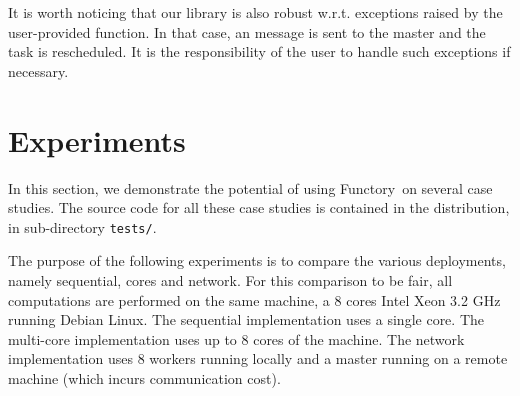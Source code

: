 \documentclass[tfpsymp,pagenumbers]{tfp07symp}
\newcommand{\functory}{\textsf{Functory}}
\begin{document}
It is worth noticing that our library is also robust w.r.t. exceptions
raised by the user-provided  function. In that case, an
 message is sent to the master and the task is
rescheduled. It is the responsibility of the user to handle such
exceptions if necessary.


\section{Experiments}\label{sec:experiments}

In this section, we demonstrate the potential of using \functory\ on
several case studies.
The source code for all these case studies is contained in the
distribution, in sub-directory \texttt{tests/}.

The purpose of the following experiments is to compare the various
deployments, namely sequential, cores and network.
For this comparison to be fair, all
computations are performed on the same machine, a 8 cores Intel Xeon
3.2 GHz running Debian Linux. The sequential implementation uses a
single core. The multi-core implementation uses up to 8 cores of
the machine. The network implementation uses 8 workers running locally and
a master running on a remote machine (which incurs communication cost).
\end{document}
